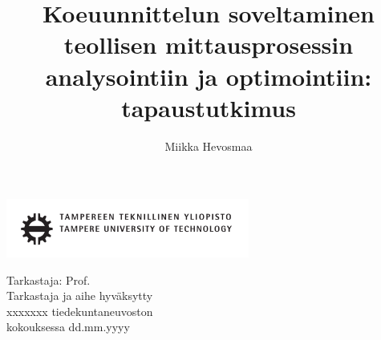 \documentclass[12pt,a4paper,finnish]{tutthesis}
\author{Miikka Hevosmaa}
\title{Koeuunnittelun soveltaminen teollisen mittausprosessin analysointiin ja optimointiin: tapaustutkimus}      %
\begin{document}
\thispagestyle{empty}
\vspace*{-1cm}\noindent
\includegraphics[width=8cm]{tty_tut_logo}   %



\vspace{6.8cm}
\maketitle
\vspace{6.cm} %

\begin{flushright}  
  \begin{minipage}[c]{6.8cm}
    \begin{spacing}{1.0}
      \textsf{Tarkastaja: Prof. \@examiner}\\
      \textsf{Tarkastaja ja aihe hyväksytty}\\ 
      \textsf{xxxxxxx tiedekuntaneuvoston}\\
      \textsf{kokouksessa dd.mm.yyyy}\\
    \end{spacing}
  \end{minipage}
\end{flushright}

\if@twoside
\clearpage
\fi



\setcounter{page}{0} %
\end{document}
